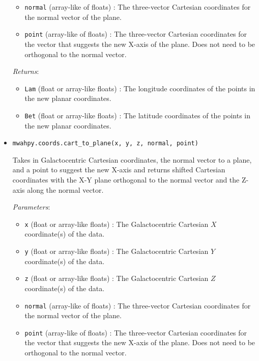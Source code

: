 \documentclass{article}
\begin{document}
\begin{itemize}
\begin{itemize}
\item \verb!normal! (array-like of floats) : The three-vector Cartesian coordinates for the normal vector of the plane.

\item \verb!point! (array-like of floats) : The three-vector Cartesian coordinates for the vector that suggests the new X-axis of the plane. Does not need to be orthogonal to the normal vector.

\end{itemize}

\textit{Returns}: \begin{itemize}

\item \verb!Lam! (float or array-like floats) : The longitude coordinates of the points in the new planar coordinates.

\item \verb!Bet! (float or array-like floats) : The latitude coordinates of the points in the new planar coordinates.

\end{itemize}



\item \verb!mwahpy.coords.cart_to_plane(x, y, z, normal, point)!

Takes in Galactocentric Cartesian coordinates, the normal vector to a plane, and a point to suggest the new X-axis and returns shifted Cartesian coordinates with the X-Y plane orthogonal to the normal vector and the Z-axis along the normal vector. 

\textit{Parameters}: \begin{itemize}

\item \verb!x! (float or array-like floats) : The Galactocentric Cartesian $X$ coordinate(s) of the data.

\item \verb!y! (float or array-like floats) : The Galactocentric Cartesian $Y$ coordinate(s) of the data.

\item \verb!z! (float or array-like floats) : The Galactocentric Cartesian $Z$ coordinate(s) of the data.

\item \verb!normal! (array-like of floats) : The three-vector Cartesian coordinates for the normal vector of the plane.

\item \verb!point! (array-like of floats) : The three-vector Cartesian coordinates for the vector that suggests the new X-axis of the plane. Does not need to be orthogonal to the normal vector.


\end{itemize}
\end{itemize}
\end{document}
